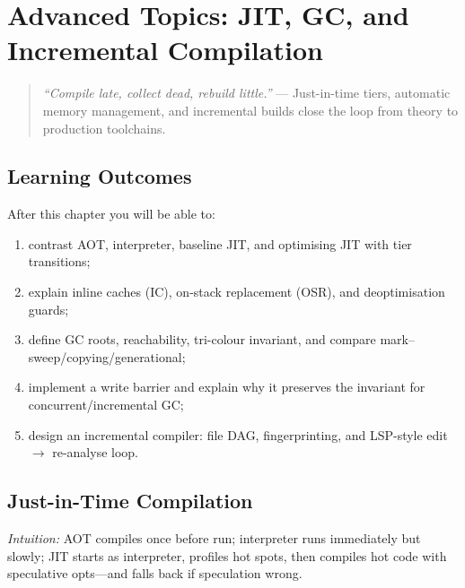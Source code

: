 \chapter{Advanced Topics: JIT, GC, and Incremental Compilation}
\label{ch:advanced}

\begin{quote}
\emph{``Compile late, collect dead, rebuild little.''} --- Just-in-time tiers, automatic memory management, and incremental builds close the loop from theory to production toolchains.
\end{quote}

\noindent{}
\vspace{0.4em}

\section*{Learning Outcomes}
After this chapter you will be able to:
\begin{enumerate}[label=(L\arabic*)]
    \item contrast AOT, interpreter, baseline JIT, and optimising JIT with tier transitions;
    \item explain inline caches (IC), on-stack replacement (OSR), and deoptimisation guards;
    \item define GC roots, reachability, tri-colour invariant, and compare mark--sweep/copying/generational;
    \item implement a write barrier and explain why it preserves the invariant for concurrent/incremental GC;
    \item design an incremental compiler: file DAG, fingerprinting, and LSP-style edit $\to$ re-analyse loop.
\end{enumerate}

\section{Just-in-Time Compilation}
\label{sec:jit}
\emph{Intuition:} AOT compiles once before run; interpreter runs immediately but slowly; JIT starts as interpreter, profiles hot spots, then compiles hot code with speculative opts---and falls back if speculation wrong.

